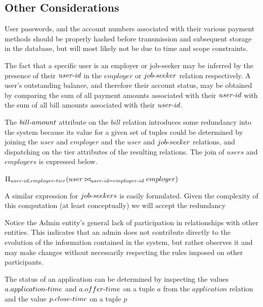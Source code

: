 \documentclass{article}
\newcommand{\tdash}{\textnormal{-}}
\begin{document}
        \subsection{Other Considerations} \label{sec:etc}
            \par User passwords, and the account numbers associated with their various payment methods should be
            properly hashed before transmission and subsequent storage in the database, but will most likely not be due
            to time and scope constraints. \par The fact that a specific user is an employer or job-seeker may be
            inferred by the presence of their $user \tdash id$ in the $employer$ or $job \tdash seeker$ relation
            respectively. A user’s outstanding balance, and therefore their account status, may be obtained by
            comparing the sum of all payment amounts associated with their $user \tdash id$ with the sum of all bill
            amounts associated with their $user \tdash id$. \par The $bill \tdash amount$ attribute on the $bill$
            relation introduces some redundancy into the system because its value for a given set of tuples could be
            determined by joining the $user$ and $employer$ and the $user$ and $job \tdash seeker$ relations, and
            dispatching on the tier attributes of the resulting relations. The join of $users$ and $employers$ is
            expressed below.
            \begin{center}
                $\Pi_{user \tdash id, employer \tdash tier}(user \bowtie_{user \tdash id = employer \tdash id}
                employer)$
            \end{center}
            A similar expression for $job \tdash seekers$ is easily formulated. Given the complexity of this
            computation (at least conceptually) we will accept the redundancy \par Notice the Admin entity’s general
            lack of participation in relationships with other entities. This indicates that an admin does not
            contribute directly to the evolution of the information contained in the system, but rather observes it and
            may make changes without necessarily respecting the rules imposed on other participants. \par The status of
            an application can be determined by inspecting the values $a.application \tdash time$ and $a.offer \tdash
            time$ on a tuple $a$ from the $application$ relation and the value $p.close \tdash time$ on a tuple $p$
\end{document}
